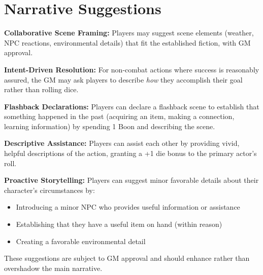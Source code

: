 \section{Narrative Suggestions}

\textbf{Collaborative Scene Framing:} Players may suggest scene elements (weather, NPC reactions, environmental details) that fit the established fiction, with GM approval.

\textbf{Intent-Driven Resolution:} For non-combat actions where success is reasonably assured, the GM may ask players to describe \emph{how} they accomplish their goal rather than rolling dice.

\textbf{Flashback Declarations:} Players can declare a flashback scene to establish that something happened in the past (acquiring an item, making a connection, learning information) by spending 1 Boon and describing the scene.

\textbf{Descriptive Assistance:} Players can assist each other by providing vivid, helpful descriptions of the action, granting a +1 die bonus to the primary actor's roll.

\textbf{Proactive Storytelling:} Players can suggest minor favorable details about their character's circumstances by:
\begin{itemize}
\item Introducing a minor NPC who provides useful information or assistance
\item Establishing that they have a useful item on hand (within reason)
\item Creating a favorable environmental detail
\end{itemize}

These suggestions are subject to GM approval and should enhance rather than overshadow the main narrative. 
